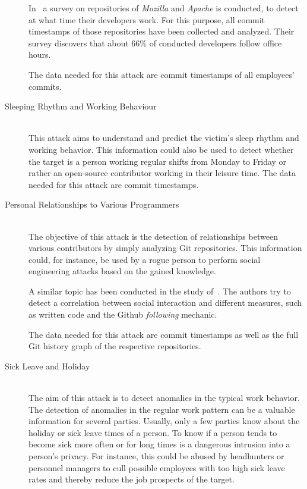 \begin{description}
        In~\cite{article:do-programmers-work-at-night} a survey on repositories of \emph{Mozilla} and \emph{Apache} is conducted, to detect at what time their developers work.
        For this purpose, all commit timestamps of those repositories have been collected and analyzed.
        Their survey discovers that about 66\% of conducted developers follow office hours.

        The data needed for this attack are commit timestamps of all employees' commits.

    \item[Sleeping Rhythm and Working Behaviour] \hfill \\
        This attack aims to understand and predict the victim's sleep rhythm and working behavior.
        This information could also be used to detect whether the target is a person working regular shifts from Monday to Friday or rather an open-source contributor working in their leisure time.
        The data needed for this attack are commit timestamps.

    \item[Personal Relationships to Various Programmers] \hfill \\
        The objective of this attack is the detection of relationships between various contributors by simply analyzing Git repositories.
        This information could, for instance, be used by a rogue person to perform social engineering attacks based on the gained knowledge.

        A similar topic has been conducted in the study of~\cite{inproceedings:exploring-the-ecosystem}.
        The authors try to detect a correlation between social interaction and different measures, such as written code and the Github \emph{following} mechanic.

        The data needed for this attack are commit timestamps as well as the full Git history graph of the respective repositories.

    \item[Sick Leave and Holiday] \hfill \\
        The aim of this attack is to detect anomalies in the typical work behavior.
        The detection of anomalies in the regular work pattern can be a valuable information for several parties.
        Usually, only a few parties know about the holiday or sick leave times of a person.
        To know if a person tends to become sick more often or for long times is a dangerous intrusion into a person's privacy.
        For instance, this could be abused by headhunters or personnel managers to cull possible employees with too high sick leave rates and thereby reduce the job prospects of the target.


\end{description}
